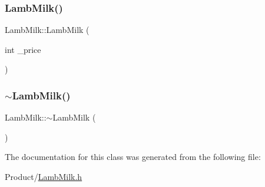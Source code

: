 \mbox{\label{classLambMilk_a96878c1e2a147c54bfb7f1e2fa437d3e}} 
\subsubsection{\texorpdfstring{LambMilk()}{LambMilk()}\hspace{0.1cm}{\footnotesize\ttfamily [2/2]}}
{\footnotesize\ttfamily Lamb\+Milk\+::\+Lamb\+Milk (\begin{DoxyParamCaption}\item[{int}]{\+\_\+price }\end{DoxyParamCaption})}

\mbox{\label{classLambMilk_ae1fe22db66d3021363aed69d45b4b161}} 
\subsubsection{\texorpdfstring{$\sim$LambMilk()}{~LambMilk()}}
{\footnotesize\ttfamily Lamb\+Milk\+::$\sim$\+Lamb\+Milk (\begin{DoxyParamCaption}{ }\end{DoxyParamCaption})}



The documentation for this class was generated from the following file\+:\begin{DoxyCompactItemize}
\item 
Product/\mbox{\hyperlink{LambMilk_8h}{Lamb\+Milk.\+h}}\end{DoxyCompactItemize}
